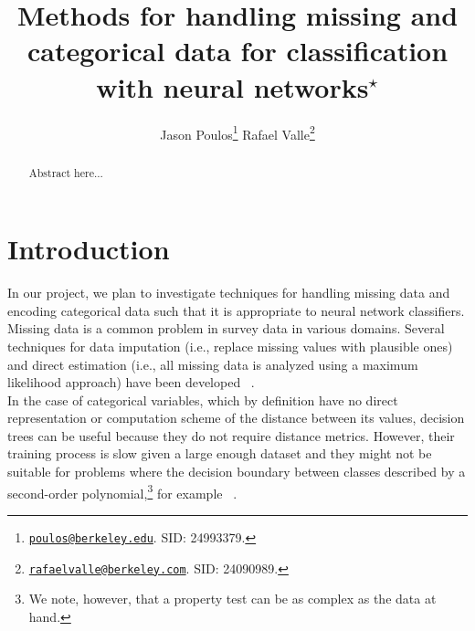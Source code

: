 \documentclass[10pt,twocolumn,letterpaper]{article}
\begin{document}
\title{Methods for handling missing and categorical data for classification with neural
networks$^\star$}

\author{
    Jason Poulos\thanks{\href{mailto:poulos@berkeley.edu}{\nolinkurl{poulos@berkeley.edu}}. SID: 24993379.}
    \hspace{10mm}
    Rafael Valle\thanks{\href{mailto:rafaelvalle@berkeley.com}{\nolinkurl{rafaelvalle@berkeley.com}}. SID: 24090989.}
    \vspace{15mm}
}

\maketitle

\begin{abstract}
Abstract here...
\end{abstract}



\section{Introduction} \label{section:Intro}

In our project, we plan to investigate techniques for handling missing data and
encoding categorical data such that it is appropriate to neural network
classifiers. \\

Missing data is a common problem in survey data in various domains. Several
techniques for data imputation (i.e., replace missing values with plausible ones) and
direct estimation (i.e., all missing data is analyzed using a maximum likelihood
approach) have been developed ~\cite{de2003prevention}. \\

In the case of categorical variables, which by definition have no direct
representation or computation scheme of the distance between its values,
decision trees can be useful because they do not require distance metrics.
However, their training process is slow given a large enough dataset and they
might not be suitable for problems where the decision boundary between classes
described by a second-order polynomial,\footnote{We note, however, that a
property test can be as complex as the data at hand.} for
example ~\cite{fayyad1996data}. \\
\end{document}

